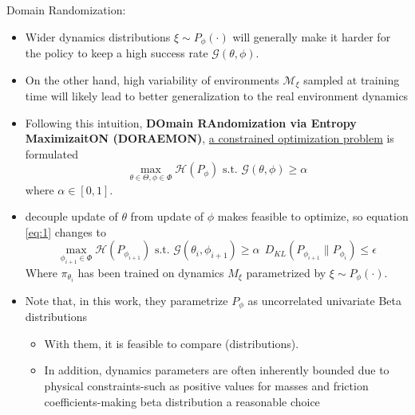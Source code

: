 \documentclass{beamer}
\newcommand{\mc}[1]{\mathcal{#1}}
\newcommand{\tb}[1]{\textbf{#1}}
\begin{document}
\begin{frame}{Domain Randomization: \cite{tiboniDomainRandomizationEntropy2024}}
    \begin{itemize}
        \item Wider dynamics distributions $\xi \sim P_\phi(\cdot)$ will generally make it harder for the policy to keep a high success rate $\mc{G}(\theta, \phi)$.
        \item On the other hand, high variability of environments $\mc{M}_\xi$ sampled at training time will likely lead to better generalization to the real environment dynamics
        \item Following this intuition, \tb{DOmain RAndomization via Entropy MaximizaitON (DORAEMON)}, \underline{a constrained optimization problem} is formulated
        \begin{equation} \label{eq:1}
            \max_{\theta \in \Theta, \phi \in \Phi} \mc{H}(P_\phi) \text{ s.t. } \mc{G}(\theta, \phi) \geq \alpha
        \end{equation}
        where $\alpha \in [0,1]$.

        \item decouple update of $\theta$ from update of $\phi$ makes feasible to optimize, so equation \ref{eq:1} changes to
        \begin{equation} \label{eq:2}
            \max_{\phi_{i+1} \in \Phi} \mc{H}(P_{\phi_{i+1}}) \text{ s.t. } \mc{G}(\theta_i, \phi_{i+1}) \geq \alpha \ \ D_{KL}(P_{\phi_{i+1}}\parallel P_{\phi_i}) \leq \epsilon
        \end{equation}
        Where $\pi_{\theta_i}$ has been trained on dynamics $M_{\xi}$ parametrized by $\xi \sim P_{\phi}(\cdot)$.
        \item Note that, in this work, they parametrize $P_\phi$ as uncorrelated univariate Beta distributions
        \begin{itemize}
            \item With them, it is feasible to compare (distributions).
            \item In addition, dynamics parameters are often inherently bounded due to physical constraints-such as positive values for masses and friction coefficients-making beta distribution a reasonable choice
        \end{itemize}
    \end{itemize}
\end{frame}
\end{document}
